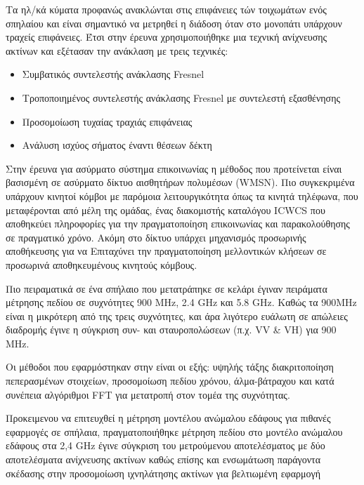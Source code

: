 \documentclass[12pt]{article}
\begin{document}
\begin{multicols*}{2}
        Τα ηλ/κά κύματα προφανώς ανακλώνται στις επιφάνειες τών τοιχωμάτων ενός σπηλαίου και
        είναι σημαντικό να μετρηθεί η διάδοση όταν στο μονοπάτι υπάρχουν τραχείς επιφάνειες.
        Έτσι στην έρευνα \cite{soo_investigation_2018} χρησιμοποιήθηκε μια τεχνική ανίχνευσης 
        ακτίνων και εξέτασαν την ανάκλαση με τρεις τεχνικές:
        \begin{itemize}
            \item Συμβατικός συντελεστής ανάκλασης Fresnel
            \item Τροποποιημένος συντελεστής ανάκλασης Fresnel με συντελεστή εξασθένησης
            \item Προσομοίωση τυχαίας τραχιάς επιφάνειας
            \item Ανάλυση ισχύος σήματος έναντι θέσεων δέκτη
        \end{itemize}

        Στην έρευνα για ασύρματο σύστημα επικοινωνίας \cite{yavuz_-cave_2009} η μέθοδος που
        προτείνεται είναι βασισμένη σε ασύρματο δίκτυο αισθητήρων πολυμέσων (WMSN). Πιο
        συγκεκριμένα υπάρχουν κινητοί κόμβοι με παρόμοια λειτουργικότητα όπως τα κινητά τηλέφωνα,
        που μεταφέρονται από μέλη της ομάδας, ένας διακομιστής καταλόγου ICWCS που αποθηκεύει
        πληροφορίες για την πραγματοποίηση επικοινωνίας και παρακολούθησης σε πραγματικό χρόνο. Ακόμη
        στο δίκτυο υπάρχει μηχανισμός προσωρινής αποθήκευσης για να Επιταχύνει την πραγματοποίηση
        μελλοντικών κλήσεων σε προσωρινά αποθηκευμένους κινητούς κόμβους.
        
        Πιο πειραματικά σε ένα σπήλαιο που μετατράπηκε σε κελάρι \cite{soo_propagation_2018}
        έγιναν πειράματα μέτρησης πεδίου σε συχνότητες 900 MHz, 2.4 GHz και 5.8 GHz. Καθώς
        τα 900MHz είναι η μικρότερη από της τρεις συχνότητες, και άρα λιγότερο ευάλωτη σε 
        απώλειες διαδρομής έγινε η σύγκριση συν- και σταυροπολώσεων (π.χ. VV \& VH) για 900 MHz.
        
        Οι μέθοδοι που εφαρμόστηκαν στην \cite{pingenot_full_2005} είναι οι εξής: υψηλής τάξης
        διακριτοποίηση πεπερασμένων στοιχείων, προσομοίωση πεδίου χρόνου, άλμα-βάτραχου και
        κατά συνέπεια αλγόριθμοι FFT για μετατροπή στον τομέα της συχνότητας.

        Προκειμενου να επιτευχθεί η μέτρηση μοντέλου ανώμαλου εδάφους για πιθανές εφαρμογές
        σε σπήλαια, πραγματοποιήθηκε μέτρηση πεδίου στο μοντέλο ανώμαλου εδάφους στα 2,4 GHz
        έγινε σύγκριση του μετρούμενου αποτελέσματος με δύο αποτελέσματα ανίχνευσης ακτίνων
        καθώς επίσης και ενσωμάτωση παράγοντα σκέδασης στην προσομοίωση ιχνηλάτησης ακτίνων
        για βελτιωμένη εφαρμογή



\end{multicols*}
\end{document}
